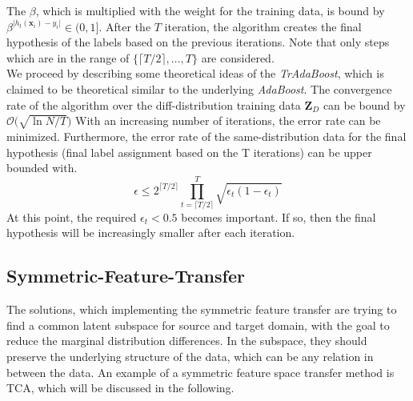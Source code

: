 The $\beta$, which is multiplied with the weight for the training data, is bound by $\beta^{\vert h_t(\mathbf{x}_i )-y_i\vert} \in (0,1]$.
After the $T$ iteration, the algorithm creates the final hypothesis of the labels based on the previous iterations.
Note that only steps which are in the range of $\{\lceil T /2 \rceil,\dots,T\}$ are considered.\cite{Dai.}\\
We proceed by describing some theoretical ideas of the \textit{TrAdaBoost}, which is claimed to be theoretical similar to the underlying \textit{AdaBoost}.
The convergence rate of the algorithm over the diff-distribution training data $\mathbf{Z}_D$ can be bound by $\mathcal{O}\big(\sqrt{\ln N /T }\big)$
With an increasing number of iterations, the error rate can be minimized.
Furthermore, the error rate of the same-distribution data for the final hypothesis (final label assignment based on the T iterations) can be upper bounded with.
\begin{equation}
	\epsilon \le 2^{\lceil T / 2\rceil} \prod_{t=\lceil T / 2\rceil}^{T} \sqrt{\epsilon_t(1-\epsilon_t)}
\end{equation}
At this point, the required $\epsilon_t < 0.5$ becomes important.
If so, then the final hypothesis will be increasingly smaller after each iteration.\cite{Dai.}

\subsection{Symmetric-Feature-Transfer}\label{TlSubSecHomoSymFeature}
The solutions, which implementing the symmetric feature transfer are trying to find a common latent subspace for source and target domain, with the goal to reduce the marginal distribution differences.
In the subspace, they should preserve the underlying structure of the data, which can be any relation in between the data.
An example of a symmetric feature space transfer method is \ac{TCA}, which will be discussed in the following.\cite[p. 6]{Weiss.2016}
